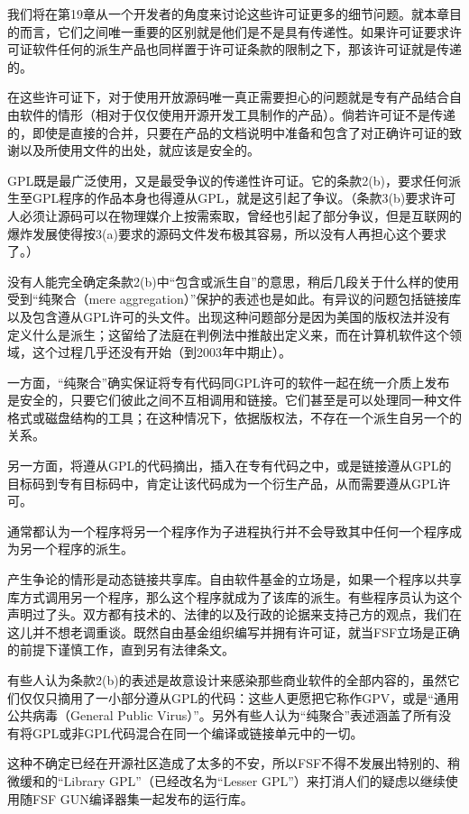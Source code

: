 \documentclass[12pt,oneside]{ctexbook}
\begin{document}
\begin{common-format}
我们将在第19章从一个开发者的角度来讨论这些许可证更多的细节问题。就本章目的而言，它们之间唯一重要的区别就是他们是不是具有传递性。如果许可证要求许可证软件任何的派生产品也同样置于许可证条款的限制之下，那该许可证就是传递的。

在这些许可证下，对于使用开放源码唯一真正需要担心的问题就是专有产品结合自由软件的情形（相对于仅仅使用开源开发工具制作的产品）。倘若许可证不是传递的，即使是直接的合并，只要在产品的文档说明中准备和包含了对正确许可证的致谢以及所使用文件的出处，就应该是安全的。

GPL既是最广泛使用，又是最受争议的传递性许可证。它的条款2(b)，要求任何派生至GPL程序的作品本身也得遵从GPL，就是这引起了争议。（条款3(b)要求许可人必须让源码可以在物理媒介上按需索取，曾经也引起了部分争议，但是互联网的爆炸发展使得按3(a)要求的源码文件发布极其容易，所以没有人再担心这个要求了。）

没有人能完全确定条款2(b)中“包含或派生自”的意思，稍后几段关于什么样的使用受到“纯聚合（mere aggregation）”保护的表述也是如此。有异议的问题包括链接库以及包含遵从GPL许可的头文件。出现这种问题部分是因为美国的版权法并没有定义什么是派生；这留给了法庭在判例法中推敲出定义来，而在计算机软件这个领域，这个过程几乎还没有开始（到2003年中期止）。

一方面，“纯聚合”确实保证将专有代码同GPL许可的软件一起在统一介质上发布是安全的，只要它们彼此之间不互相调用和链接。它们甚至是可以处理同一种文件格式或磁盘结构的工具；在这种情况下，依据版权法，不存在一个派生自另一个的关系。

另一方面，将遵从GPL的代码摘出，插入在专有代码之中，或是链接遵从GPL的目标码到专有目标码中，肯定让该代码成为一个衍生产品，从而需要遵从GPL许可。

通常都认为一个程序将另一个程序作为子进程执行并不会导致其中任何一个程序成为另一个程序的派生。

产生争论的情形是动态链接共享库。自由软件基金的立场是，如果一个程序以共享库方式调用另一个程序，那么这个程序就成为了该库的派生。有些程序员认为这个声明过了头。双方都有技术的、法律的以及行政的论据来支持己方的观点，我们在这儿并不想老调重谈。既然自由基金组织编写并拥有许可证，就当FSF立场是正确的前提下谨慎工作，直到另有法律条文。

有些人认为条款2(b)的表述是故意设计来感染那些商业软件的全部内容的，虽然它们仅仅只摘用了一小部分遵从GPL的代码：这些人更愿把它称作GPV，或是“通用公共病毒（General Public Virus）”。另外有些人认为“纯聚合”表述涵盖了所有没有将GPL或非GPL代码混合在同一个编译或链接单元中的一切。

这种不确定已经在开源社区造成了太多的不安，所以FSF不得不发展出特别的、稍微缓和的“Library GPL”（已经改名为“Lesser GPL”）来打消人们的疑虑以继续使用随FSF GUN编译器集一起发布的运行库。


\end{common-format}
\end{document}
